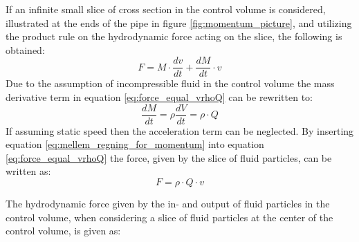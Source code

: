 If an infinite small slice of cross section in the control volume is considered, illustrated at the ends of the pipe in figure \ref{fig:momentum_picture}, and utilizing the product rule on the hydrodynamic force acting on the slice, the following is obtained:  
\begin{equation}\label{eq:force_equal_vrhoQ}
	F= M \cdot \frac{dv}{dt} + \frac{dM}{dt} \cdot v 
\end{equation}
Due to the assumption of incompressible fluid in the control volume the mass derivative term in equation \ref{eq:force_equal_vrhoQ} can be rewritten to:
\begin{equation}\label{eq:mellem_regning_for_momentum}
	\frac{dM}{dt} = \rho \frac{dV}{dt} = \rho\cdot Q
\end{equation}
If assuming static speed then the acceleration term can be neglected. By inserting equation \ref{eq:mellem_regning_for_momentum} into equation \ref{eq:force_equal_vrhoQ} the force, given by the slice of fluid particles, can be written as:
\begin{equation}
	F = \rho\cdot Q\cdot v 
\end{equation}

The hydrodynamic force given by the in- and output of fluid particles in the control volume, when considering a slice of fluid particles at the center of the control volume,%
is given as:


